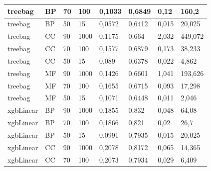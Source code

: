 \documentclass[12pt]{report}
\begin{document}
\begin{appendices}
\begin{longtable}[h]{|l|l|l|l|l|l|l|l|}
treebag            & BP            & 70                & 100                & 0,1033         & 0,6849         & 0,12                     & 160,2                \\ \hline
treebag            & BP            & 50                & 15                 & 0,0572         & 0,6412         & 0,015                    & 20,025               \\ \hline
treebag            & CC            & 90                & 1000               & 0,1175         & 0,664          & 2,032                    & 449,072              \\ \hline
treebag            & CC            & 70                & 100                & 0,1577         & 0,6879         & 0,173                    & 38,233               \\ \hline
treebag            & CC            & 50                & 15                 & 0,089          & 0,6378         & 0,022                    & 4,862                \\ \hline
treebag            & MF            & 90                & 1000               & 0,1426         & 0,6601         & 1,041                    & 193,626              \\ \hline
treebag            & MF            & 70                & 100                & 0,1655         & 0,6715         & 0,093                    & 17,298               \\ \hline
treebag            & MF            & 50                & 15                 & 0,1071         & 0,6448         & 0,011                    & 2,046                \\ \hline
xgbLinear          & BP            & 90                & 1000               & 0,1855         & 0,832          & 0,048                    & 64,08                \\ \hline
xgbLinear          & BP            & 70                & 100                & 0,1866         & 0,821          & 0,02                     & 26,7                 \\ \hline
xgbLinear          & BP            & 50                & 15                 & 0,0991         & 0,7935         & 0,015                    & 20,025               \\ \hline
xgbLinear          & CC            & 90                & 1000               & 0,2078         & 0,8172         & 0,065                    & 14,365               \\ \hline
xgbLinear          & CC            & 70                & 100                & 0,2073         & 0,7934         & 0,029                    & 6,409                \\ \hline

\end{longtable}
\end{appendices}
\end{document}
